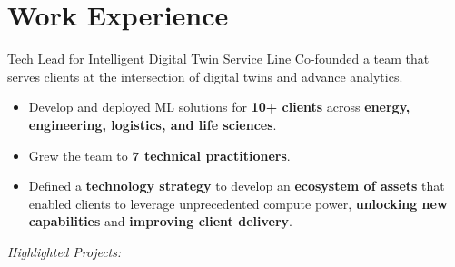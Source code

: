 \documentclass[a4paper]{deedy-resume} %
\begin{document}
\section{Work Experience}
\vspace{-5pt}
\begin{callout}{Tech Lead for Intelligent Digital Twin Service Line}
\linebreak
    Co-founded a team that serves clients at the intersection of digital twins and advance analytics.
    \vspace{-10pt}
    \begin{multicols}{2}
        \begin{itemize}
            \item Develop and deployed ML solutions for \textbf{10+ clients} across \textbf{energy, engineering, logistics, and life sciences}. 
            \item Grew the team to \textbf{7 technical practitioners}.
            \columnbreak
            \item Defined a \textbf{technology strategy} to develop an \textbf{ecosystem of assets} that enabled clients to leverage unprecedented compute power, \textbf{unlocking new capabilities} and \textbf{improving client delivery}.
        \end{itemize}
    \end{multicols}
\end{callout}
\vspace{-2pt}
\textit{Highlighted Projects:}
\vspace{-10pt}
\end{document}
